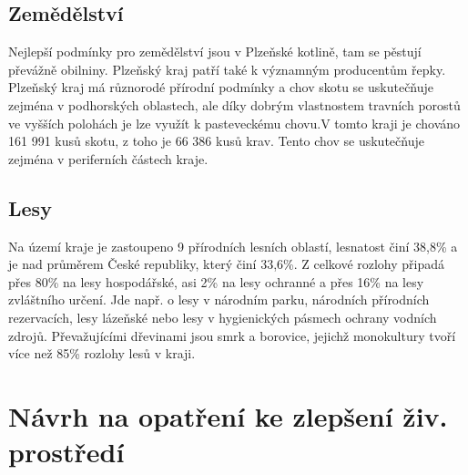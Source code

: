 \documentclass[12pt]{article} %
\begin{document}
\subsection{Zemědělství}
Nejlepší podmínky pro zemědělství jsou v Plzeňské kotlině, tam se pěstují převážně obilniny. Plzeňský kraj patří také k významným producentům řepky. Plzeňský kraj má různorodé přírodní podmínky a chov skotu se uskutečňuje zejména v podhorských oblastech, ale díky dobrým vlastnostem travních porostů ve vyšších polohách je lze využít k pasteveckému chovu.V tomto kraji je chováno 161 991 kusů skotu, z toho je 66 386 kusů krav. Tento chov se uskutečňuje zejména v periferních částech kraje.

\subsection{Lesy}
Na území kraje je zastoupeno 9 přírodních lesních oblastí, lesnatost činí 38,8\% a je nad průměrem České republiky, který činí 33,6\%. Z celkové rozlohy připadá přes 80\% na lesy hospodářské, asi 2\% na lesy ochranné a přes 16\% na lesy zvláštního určení. Jde např. o lesy v národním parku, národních přírodních rezervacích, lesy lázeňské nebo lesy v hygienických pásmech ochrany vodních zdrojů. Převažujícími dřevinami jsou smrk a borovice, jejichž monokultury tvoří více než 85\% rozlohy lesů v kraji.

\section{Návrh na opatření ke zlepšení živ. prostředí}
\end{document}

